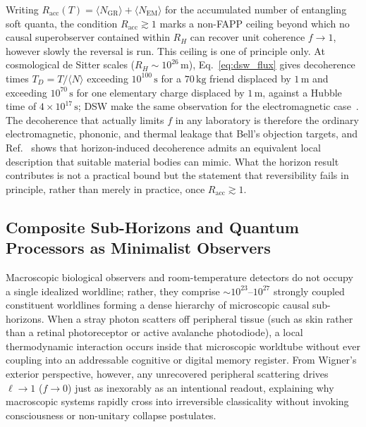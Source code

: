 Writing $R_{\mathrm{acc}}(T) = \langle N_{\mathrm{GR}} \rangle + \langle N_{\mathrm{EM}} \rangle$ for the accumulated number of entangling soft quanta, the condition $R_{\mathrm{acc}} \gtrsim 1$ marks a non-FAPP ceiling beyond which no causal superobserver contained within $R_H$ can recover unit coherence $f \to 1$, however slowly the reversal is run. This ceiling is one of principle only. At cosmological de Sitter scales ($R_H \sim 10^{26}\,\mathrm{m}$), Eq.~\eqref{eq:dsw_flux} gives decoherence times $T_D = T / \langle N \rangle$ exceeding $10^{100}\,\mathrm{s}$ for a $70\,\mathrm{kg}$ friend displaced by $1\,\mathrm{m}$ and exceeding $10^{70}\,\mathrm{s}$ for one elementary charge displaced by $1\,\mathrm{m}$, against a Hubble time of $4 \times 10^{17}\,\mathrm{s}$; DSW make the same observation for the electromagnetic case~\cite{danielson2023}. The decoherence that actually limits $f$ in any laboratory is therefore the ordinary electromagnetic, phononic, and thermal leakage that Bell's objection targets, and Ref.~\cite{danielson2025} shows that horizon-induced decoherence admits an equivalent local description that suitable material bodies can mimic. What the horizon result contributes is not a practical bound but the statement that reversibility fails in principle, rather than merely in practice, once $R_{\mathrm{acc}} \gtrsim 1$.

\subsection{Composite Sub-Horizons and Quantum Processors as Minimalist Observers}

Macroscopic biological observers and room-temperature detectors do not occupy a single idealized worldline; rather, they comprise $\sim 10^{23}$--$10^{27}$ strongly coupled constituent worldlines forming a dense hierarchy of microscopic causal sub-horizons. When a stray photon scatters off peripheral tissue (such as skin rather than a retinal photoreceptor or active avalanche photodiode), a local thermodynamic interaction occurs inside that microscopic worldtube without ever coupling into an addressable cognitive or digital memory register. From Wigner's exterior perspective, however, any unrecovered peripheral scattering drives $\ell \to 1$ ($f \to 0$) just as inexorably as an intentional readout, explaining why macroscopic systems rapidly cross into irreversible classicality without invoking consciousness or non-unitary collapse postulates.

